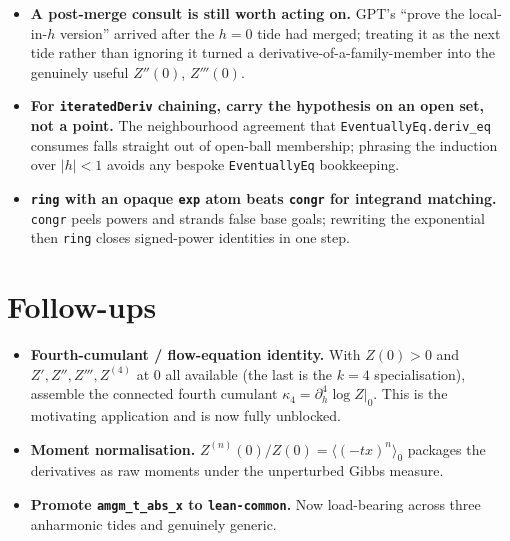 \documentclass[11pt]{article}
\begin{document}
\begin{itemize}[itemsep=3pt]
\item \textbf{A post-merge consult is still worth acting on.} GPT's
  ``prove the local-in-$h$ version'' arrived after the $h=0$ tide had merged;
  treating it as the next tide rather than ignoring it turned a
  derivative-of-a-family-member into the genuinely useful $Z''(0)$, $Z'''(0)$.
\item \textbf{For \texttt{iteratedDeriv} chaining, carry the hypothesis on an
  open set, not a point.} The neighbourhood agreement that
  \texttt{EventuallyEq.deriv\_eq} consumes falls straight out of open-ball
  membership; phrasing the induction over $|h|<1$ avoids any bespoke
  \texttt{EventuallyEq} bookkeeping.
\item \textbf{\texttt{ring} with an opaque \texttt{exp} atom beats \texttt{congr}
  for integrand matching.} \texttt{congr} peels powers and strands false base
  goals; rewriting the exponential then \texttt{ring} closes signed-power
  identities in one step.
\end{itemize}

\section{Follow-ups}

\begin{itemize}[itemsep=3pt]
\item \textbf{Fourth-cumulant / flow-equation identity.} With $Z(0)>0$ and
  $Z',Z'',Z''',Z^{(4)}$ at $0$ all available (the last is the $k=4$
  specialisation), assemble the connected fourth cumulant
  $\kappa_4=\partial_h^4\log Z|_0$. This is the motivating application and is
  now fully unblocked.
\item \textbf{Moment normalisation.} $Z^{(n)}(0)/Z(0)=\langle(-tx)^n\rangle_0$
  packages the derivatives as raw moments under the unperturbed Gibbs measure.
\item \textbf{Promote \texttt{amgm\_t\_abs\_x} to \texttt{lean-common}.} Now
  load-bearing across three anharmonic tides and genuinely generic.
\end{itemize}
\end{document}
